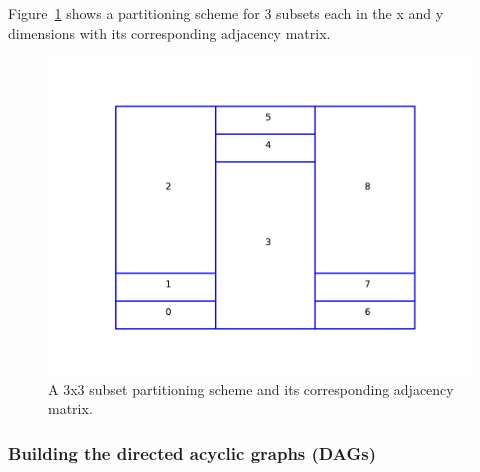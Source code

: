 \documentclass[times,final]{elsarticle}
\begin{document}
Figure~\ref{25basematrix} shows a partitioning scheme for 3 subsets each in the x and y dimensions with its corresponding adjacency matrix.

\begin{figure}[H]
\begin{minipage}[c]{0.5\textwidth}
\centering
\includegraphics[scale=0.7]{../figures/boundaries_worst.pdf}
\end{minipage}
\begin{minipage}[c]{0.6\textwidth}
\centering
{}
\end{minipage}
\caption{A 3x3 subset partitioning scheme and its corresponding adjacency matrix.}
\label{25basematrix}
\end{figure}

\subsubsection{Building the directed acyclic graphs (DAGs)}
\end{document}
